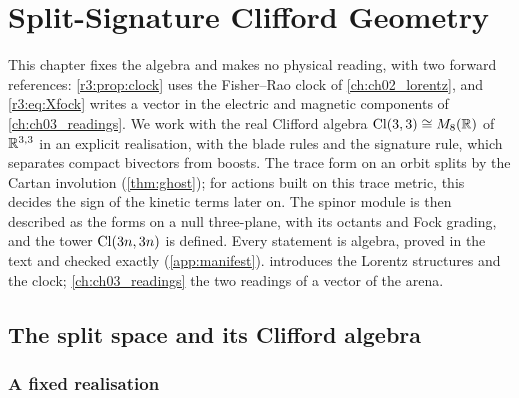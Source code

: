 \chapter{Split-Signature Clifford Geometry}
\label{ch:ch01_clifford}

This chapter fixes the algebra and makes no physical reading, with two forward references: \cref{r3:prop:clock} uses the Fisher--Rao clock
of \cref{ch:ch02_lorentz}, and \eqref{r3:eq:Xfock} writes a vector in the electric and magnetic components of \cref{ch:ch03_readings}. We work
with the real Clifford algebra $\mathrm{Cl}(3,3)\cong M_8(\mathbb{R})$ of $\mathbb{R}^{3,3}$ in an explicit realisation, with the blade rules and the signature rule,
which separates compact bivectors from boosts. The trace form on an orbit splits by the Cartan involution (\cref{thm:ghost}); for actions built
on this trace metric, this decides the sign of the kinetic terms later on. The
spinor module is then described as the forms on a null three-plane, with its octants and Fock grading, and the tower $\mathrm{Cl}(3n,3n)$ is
defined. Every statement is algebra, proved in the text and checked exactly (\cref{app:manifest}).  introduces
the Lorentz structures and the clock; \cref{ch:ch03_readings} the two readings of a vector of the arena.




\section{The split space and its Clifford algebra}
\label{sec:arena}

\subsection{A fixed realisation}

